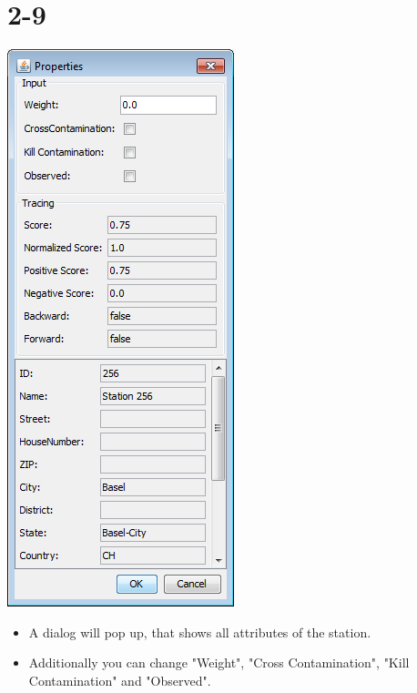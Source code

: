 \documentclass[10pt]{beamer}
\begin{document}
\section{2-9}
\begin{frame}
	\begin{center}
  		\includegraphics[height=0.6\textheight]{2-9.png}
	\end{center}
	\begin{itemize}
		\item A dialog will pop up, that shows all attributes of the station.
		\item Additionally you can change "Weight", "Cross Contamination", "Kill Contamination" and "Observed".
	\end{itemize}
\end{frame}
\end{document}
